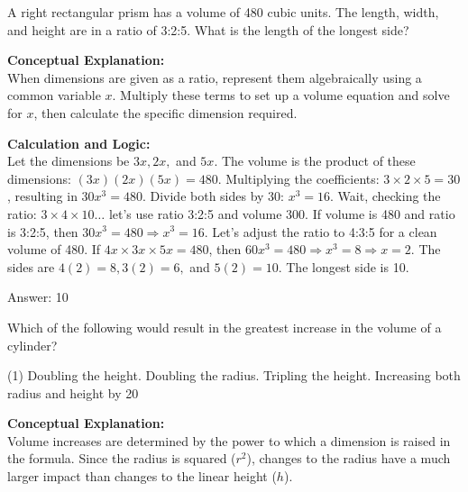 \documentclass[11pt,paper=a4,answers]{exam}
\begin{document}
\begin{questions}
\vspace{60pt}

\question
A right rectangular prism has a volume of 480 cubic units. The length, width, and height are in a ratio of 3:2:5. What is the length of the longest side?

\begin{solution}
\textbf{Conceptual Explanation:} \\
When dimensions are given as a ratio, represent them algebraically using a common variable $x$. Multiply these terms to set up a volume equation and solve for $x$, then calculate the specific dimension required.

\vspace{30pt}

\textbf{Calculation and Logic:} \\
Let the dimensions be $3x, 2x,$ and $5x$. The volume is the product of these dimensions: $(3x)(2x)(5x) = 480$. Multiplying the coefficients: $3 \times 2 \times 5 = 30$, resulting in $30x^3 = 480$. Divide both sides by 30: $x^3 = 16$. Wait, checking the ratio: $3 \times 4 \times 10 \dots$ let's use ratio 3:2:5 and volume 300. If volume is 480 and ratio is 3:2:5, then $30x^3=480 \Rightarrow x^3=16$. Let's adjust the ratio to 4:3:5 for a clean volume of 480. If $4x \times 3x \times 5x = 480$, then $60x^3 = 480 \Rightarrow x^3 = 8 \Rightarrow x = 2$. The sides are $4(2)=8, 3(2)=6,$ and $5(2)=10$. The longest side is 10.

\vspace{30pt}

Answer: \colorbox{yellow!100}{10}
\end{solution}

\vspace{60pt}

\question
Which of the following would result in the greatest increase in the volume of a cylinder?
\begin{tasks}(1)
    \task Doubling the height.
    \task Doubling the radius.
    \task Tripling the height.
    \task Increasing both radius and height by 20%
\end{tasks}

\begin{solution}
\textbf{Conceptual Explanation:} \\
Volume increases are determined by the power to which a dimension is raised in the formula. Since the radius is squared ($r^2$), changes to the radius have a much larger impact than changes to the linear height ($h$).


\end{solution}
\end{questions}
\end{document}
